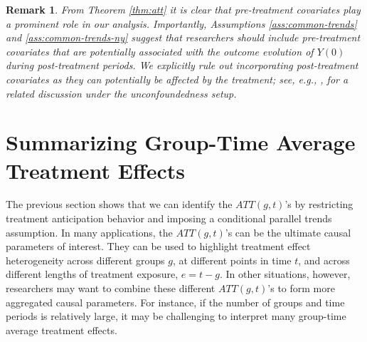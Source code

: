 \documentclass[11pt]{article}%
\theoremstyle{plain}
\newtheorem{remark}{Remark}
\numberwithin{sassumption}{section}
\numberwithin{equation}{section}
\begin{document}
\begin{remark}
From Theorem \ref{thm:att} it is clear that pre-treatment covariates play a
prominent role in our analysis. Importantly, Assumptions
\ref{ass:common-trends} and \ref{ass:common-trends-ny} suggest that
researchers should include pre-treatment covariates that are
potentially associated with the outcome evolution of $Y\left(  0\right)  $
during post-treatment periods. We explicitly rule out incorporating
post-treatment covariates as they can potentially be affected by the
treatment; see, e.g., \cite{Wooldridge2005a}, for a related discussion under
the unconfoundedness setup.
\end{remark}



\section{Summarizing Group-Time Average Treatment Effects {\label{sec:4} }}

The previous section shows that we can identify the $ATT(g,t)$'s by
restricting treatment anticipation behavior and imposing a conditional
parallel trends assumption. In many applications, the $ATT(g,t)$'s can be the
ultimate causal parameters of interest.  They can be used to highlight
treatment effect heterogeneity across different groups $g$, at different
points in time $t$, and across different lengths of treatment exposure,
$e=t-g$. In other situations, however, researchers may want to combine these
different $ATT\left(  g,t\right)  $'s to form more aggregated causal
parameters. For instance, if the number of groups and time periods is
relatively large, it may be challenging to interpret many group-time average
treatment effects.
\end{document}
